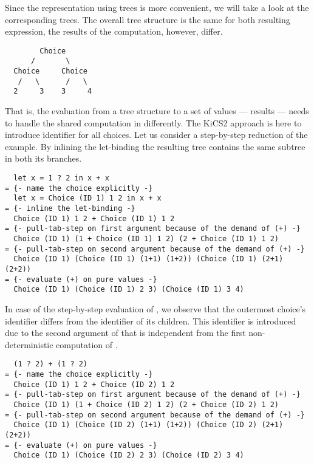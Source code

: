 Since the representation using trees is more convenient, we will take a look at the corresponding trees.
The overall tree structure is the same for both resulting expression, the results of the computation, however, differ.

\begin{verbatim}
        Choice
      /       \
  Choice     Choice
   /   \      /   \
  2     3    3     4
\end{verbatim}

That is, the evaluation from a tree structure to a set of values --- results --- needs to handle the shared computation in  differently.
The KiCS2 approach is here to introduce identifier for all choices.
Let us consider a step-by-step reduction of the \cyinl{doubleShare} example.
By inlining the let-binding the resulting tree contains the same subtree in both its branches.

\begin{verbatim}
  let x = 1 ? 2 in x + x
= {- name the choice explicitly -}
  let x = Choice (ID 1) 1 2 in x + x
= {- inline the let-binding -}
  Choice (ID 1) 1 2 + Choice (ID 1) 1 2
= {- pull-tab-step on first argument because of the demand of (+) -}
  Choice (ID 1) (1 + Choice (ID 1) 1 2) (2 + Choice (ID 1) 1 2)
= {- pull-tab-step on second argument because of the demand of (+) -}
  Choice (ID 1) (Choice (ID 1) (1+1) (1+2)) (Choice (ID 1) (2+1) (2+2))
= {- evaluate (+) on pure values -}
  Choice (ID 1) (Choice (ID 1) 2 3) (Choice (ID 1) 3 4)
\end{verbatim}

In case of the step-by-step evaluation of , we observe that the outermost choice's identifier differs from the identifier of its children.
This identifier is introduced due to the second argument of \cyinl{(+)} that is independent from the first non-deterministic computation of .

\begin{verbatim}
  (1 ? 2) + (1 ? 2)
= {- name the choice explicitly -}
  Choice (ID 1) 1 2 + Choice (ID 2) 1 2
= {- pull-tab-step on first argument because of the demand of (+) -}
  Choice (ID 1) (1 + Choice (ID 2) 1 2) (2 + Choice (ID 2) 1 2)
= {- pull-tab-step on second argument because of the demand of (+) -}
  Choice (ID 1) (Choice (ID 2) (1+1) (1+2)) (Choice (ID 2) (2+1) (2+2))
= {- evaluate (+) on pure values -}
  Choice (ID 1) (Choice (ID 2) 2 3) (Choice (ID 2) 3 4)
\end{verbatim}

